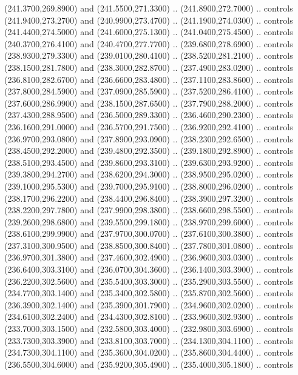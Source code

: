{\begin{scope}[y=0.80pt, x=0.80pt, yscale=-1, xscale=1, inner sep=0pt, outer sep=0pt, #1]
      (241.3700,269.8900) and (241.5500,271.3300) .. (241.8900,272.7000) .. controls
      (241.9400,273.2700) and (240.9900,273.4700) .. (241.1900,274.0300) .. controls
      (241.4400,274.5000) and (241.6000,275.1300) .. (241.0400,275.4500) .. controls
      (240.3700,276.4100) and (240.4700,277.7700) .. (239.6800,278.6900) .. controls
      (238.9300,279.3300) and (239.0100,280.4100) .. (238.5200,281.2100) .. controls
      (238.1500,281.7800) and (238.3000,282.8700) .. (237.4900,283.0200) .. controls
      (236.8100,282.6700) and (236.6600,283.4800) .. (237.1100,283.8600) .. controls
      (237.8000,284.5900) and (237.0900,285.5900) .. (237.5200,286.4100) .. controls
      (237.6000,286.9900) and (238.1500,287.6500) .. (237.7900,288.2000) .. controls
      (237.4300,288.9500) and (236.5000,289.3300) .. (236.4600,290.2300) .. controls
      (236.1600,291.0000) and (236.5700,291.7500) .. (236.9200,292.4100) .. controls
      (236.9700,293.0800) and (237.8900,293.0900) .. (238.2300,292.6500) .. controls
      (238.4500,292.2000) and (239.4800,292.3500) .. (239.1800,292.8900) .. controls
      (238.5100,293.4500) and (239.8600,293.3100) .. (239.6300,293.9200) .. controls
      (239.3800,294.2700) and (238.6200,294.3000) .. (238.9500,295.0200) .. controls
      (239.1000,295.5300) and (239.7000,295.9100) .. (238.8000,296.0200) .. controls
      (238.1700,296.2200) and (238.4400,296.8400) .. (238.3900,297.3200) .. controls
      (238.2200,297.7800) and (237.9900,298.3800) .. (238.6600,298.5500) .. controls
      (239.2600,298.6800) and (239.5500,299.1800) .. (238.9700,299.6000) .. controls
      (238.6100,299.9900) and (237.9700,300.0700) .. (237.6100,300.3800) .. controls
      (237.3100,300.9500) and (238.8500,300.8400) .. (237.7800,301.0800) .. controls
      (236.9700,301.3800) and (237.4600,302.4900) .. (236.9600,303.0300) .. controls
      (236.6400,303.3100) and (236.0700,304.3600) .. (236.1400,303.3900) .. controls
      (236.2200,302.5600) and (235.5400,303.3000) .. (235.2900,303.5500) .. controls
      (234.7700,303.1400) and (235.3400,302.5800) .. (235.8700,302.5600) .. controls
      (236.3900,302.1400) and (235.3900,301.7900) .. (234.9600,302.0200) .. controls
      (234.6100,302.2400) and (234.4300,302.8100) .. (233.9600,302.9300) .. controls
      (233.7000,303.1500) and (232.5800,303.4000) .. (232.9800,303.6900) .. controls
      (233.7300,303.3900) and (233.8100,303.7000) .. (234.1300,304.1100) .. controls
      (234.7300,304.1100) and (235.3600,304.0200) .. (235.8600,304.4400) .. controls
      (236.5500,304.6000) and (235.9200,305.4900) .. (235.4000,305.1800) .. controls

\end{scope}}
